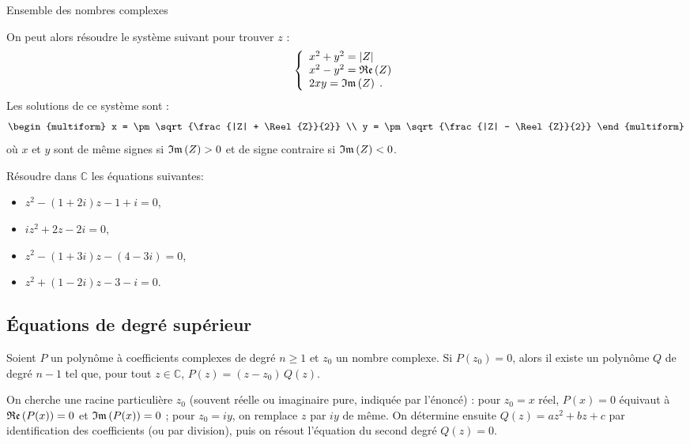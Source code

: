 \begin{chapter}{Ensemble des nombres complexes}
\begin{methode}
      On peut alors r\'esoudre le syst\`eme suivant pour trouver $z$ :
            \[
                  \left\lbrace
                        \begin{array}{l}
                              x^2 + y^2 = |Z|           \\
                              x^2 - y^2 = \mathfrak{Re}\left(Z\right)      \\
                              2 x y     = \mathfrak{Im}\left(Z\right)      \;.
                        \end{array}
                  \right. 
            \]
      Les solutions de ce syst\`eme sont :
			\[
				\begin{multiform}
					x = \pm \sqrt{\frac{|Z| + \Reel{Z}}{2}}		\\
					y = \pm \sqrt{\frac{|Z| - \Reel{Z}}{2}}		
				\end{multiform}
			\]
			o\`u $x$ et $y$ sont de m\^eme signes si $\mathfrak{Im}\left(Z\right) > 0$ et de signe contraire si $\mathfrak{Im}\left(Z\right) < 0$.
\end{methode}
%
\begin{exe}
\label{exe:second degre complexe}
      R\'esoudre dans $\mathbb{C}$ les \'equations suivantes: 
      \begin{itemize}
            \item $z^2 - (1 + 2i) z - 1 + i = 0$,
            \item $i z^2 + 2 z - 2 i = 0$,
            \item $z^2 - (1+3i) z - (4 - 3i) = 0$,
            \item $z^2 + (1-2i) z - 3 - i = 0$.
      \end{itemize}
\end{exe}

\subsection{\'Equations de degr\'e sup\'erieur}
\begin{prop}
      Soient $P$ un polyn\^ome \`a coefficients complexes de degr\'e $n \geq 1$ et $z_0$ un nombre complexe.
      Si $P(z_0) = 0$, alors il existe un polyn\^ome $Q$ de degr\'e $n - 1$ tel que, pour tout $z \in \mathbb{C}$,
      $P(z) = (z - z_0)\,Q(z)$.
\end{prop}
\begin{methode}
      On cherche une racine particuli\`ere $z_0$ (souvent r\'eelle ou imaginaire pure, indiqu\'ee par l'\'enonc\'e) :
      pour $z_0 = x$ r\'eel, $P(x) = 0$ \'equivaut \`a $\mathfrak{Re}\left(P(x)\right) = 0$ et $\mathfrak{Im}\left(P(x)\right) = 0$ ; pour $z_0 = iy$, on remplace $z$ par $iy$ de m\^eme.
      On d\'etermine ensuite $Q(z) = a z^2 + b z + c$ par identification des coefficients (ou par division),
      puis on r\'esout l'\'equation du second degr\'e $Q(z) = 0$.
\end{methode}


\end{chapter}
